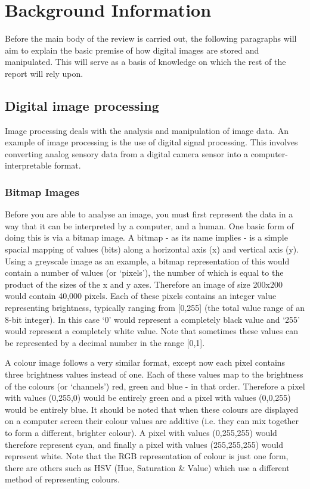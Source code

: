 \documentclass[a4paper,12pt]{report}
\begin{document}
  \section{Background Information}
    Before the main body of the review is carried out, the following paragraphs will aim to explain the basic premise of how digital images are stored and manipulated. This will serve as a basis of knowledge on which the rest of the report will rely upon.

    \subsection{Digital image processing}
     Image processing deals with the analysis and manipulation of image data. An example of image processing is the use of digital signal processing. This involves converting analog sensory data from a digital camera sensor into a computer-interpretable format.

     \subsubsection{Bitmap Images}
       Before you are able to analyse an image, you must first represent the data in a way that it can be interpreted by a computer, and a human. One basic form of doing this is via a bitmap image. A bitmap - as its name implies - is a simple spacial mapping of values (bits) along a horizontal axis (x) and vertical axis (y). Using a greyscale image as an example, a bitmap representation of this would contain a number of values (or ‘pixels’), the number of which is equal to the product of the sizes of the x and y axes. Therefore an image of size 200x200 would contain 40,000 pixels. Each of these pixels contains an integer value representing brightness, typically ranging from [0,255] (the total value range of an 8-bit integer). In this case ‘0’ would represent a completely black value and ‘255’ would represent a completely white value. Note that sometimes these values can be represented by a decimal number in the range [0,1].

       A colour image follows a very similar format, except now each pixel contains three brightness values instead of one. Each of these values map to the brightness of the colours (or ‘channels’) red, green and blue - in that order. Therefore a pixel with values (0,255,0) would be entirely green and a pixel with values (0,0,255) would be entirely blue. It should be noted that when these colours are displayed on a computer screen their colour values are additive (i.e. they can mix together to form a different, brighter colour). A pixel with values (0,255,255) would therefore represent cyan, and finally a pixel with values (255,255,255) would represent white. Note that the RGB representation of colour is just one form, there are others such as HSV (Hue, Saturation \& Value) which use a different method of representing colours.
\end{document}
